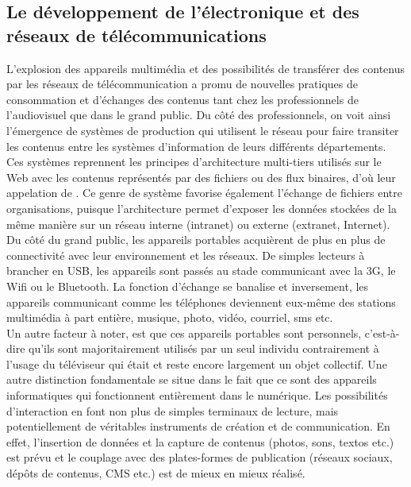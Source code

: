 

\subsection{Le développement de l'électronique et des réseaux de télécommunications}\label{sec:electro}
L’explosion des appareils multimédia et des possibilités de transférer des contenus par les réseaux de télécommunication a promu de nouvelles pratiques de consommation et d'échanges des contenus tant chez les professionnels de l'audiovisuel que dans le grand public.
% 
Du côté des professionnels, on voit ainsi l’émergence de systèmes de production qui utilisent le réseau pour faire transiter les contenus entre les systèmes d'information de leurs différents départements. 
Ces systèmes reprennent les principes d'architecture multi-tiers utilisés sur le Web avec les contenus représentés par des fichiers ou des flux binaires, d'où leur appelation de .
% 
Ce genre de système favorise également l’échange de fichiers entre organisations, puisque l’architecture permet d'exposer les données stockées de la même manière sur un réseau interne (intranet) ou externe (extranet, Internet).
% 
Du côté du grand public, les appareils portables acquièrent de plus en plus de connectivité avec leur environnement et les réseaux. 
De simples lecteurs à brancher en USB, les appareils sont passés au stade communicant avec la 3G, le Wifi ou le Bluetooth. 
La fonction d'échange se banalise et inversement, les appareils communicant comme les téléphones deviennent eux-même des stations multimédia à part entière, musique, photo, vidéo, courriel, sms etc.\\


Un autre facteur à noter, est que ces appareils portables sont personnels, c’est-à-dire qu’ils sont majoritairement utilisés par un seul individu contrairement à l’usage du téléviseur qui était et reste encore largement un objet collectif. 
Une autre distinction fondamentale se situe dans le fait que ce sont des appareils informatiques qui fonctionnent entièrement dans le numérique. 
Les possibilités d’interaction en font non plus de simples terminaux de lecture, mais potentiellement de véritables instruments de création et de communication. En effet, l'insertion de données et la capture de contenus (photos, sons, textos etc.) est prévu et le couplage avec des plates-formes de publication (réseaux sociaux, dépôts de contenus, CMS etc.) est de mieux en mieux réalisé.

